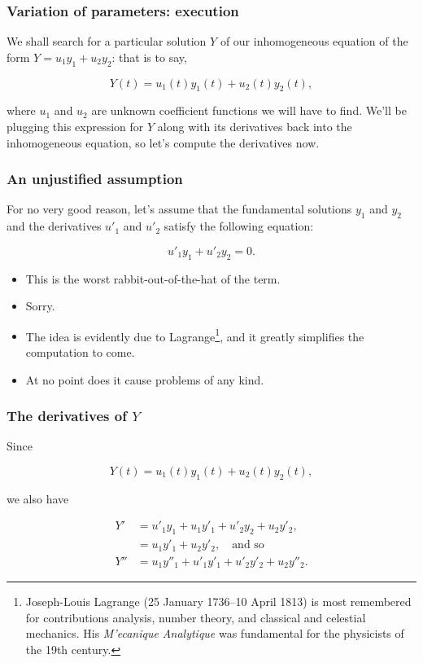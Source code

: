 \documentclass[11pt,ignorenonframetext,]{beamer}
\begin{document}
\begin{frame}\frametitle{Variation of parameters: execution}

We shall search for a particular solution $Y$ of our inhomogeneous
equation of the form $Y = u_1 y_1 + u_2 y_2$: that is to say,

\begin{equation*}
    Y(t) = u_1(t) y_1(t) + u_2(t) y_2(t),
\end{equation*}

where $u_1$ and $u_2$ are unknown coefficient functions we will have to
find. We'll be plugging this expression for $Y$ along with its
derivatives back into the inhomogeneous equation, so let's compute the
derivatives now.

\end{frame}

\begin{frame}\frametitle{An unjustified assumption}

For no very good reason, let's assume that the fundamental solutions
$y_1$ and $y_2$ and the derivatives $u'_1$ and $u'_2$ satisfy the
following equation:

\begin{equation*}
    u'_1 y_1 + u'_2 y_2  = 0.
\end{equation*}

\begin{itemize}
\itemsep1pt\parskip0pt
\item
  This is the worst rabbit-out-of-the-hat of the term.
\item
  Sorry.
\item
  The idea is evidently due to Lagrange\footnote{Joseph-Louis Lagrange
    (25 January 1736--10 April 1813) is most remembered for
    contributions analysis, number theory, and classical and celestial
    mechanics. His \emph{M'ecanique Analytique} was fundamental for the
    physicists of the 19th century.}, and it greatly simplifies the
  computation to come.
\item
  At no point does it cause problems of any kind.
\end{itemize}

\end{frame}

\begin{frame}\frametitle{The derivatives of $Y$}

Since

\begin{equation*}
    Y(t) = u_1(t) y_1(t) + u_2(t) y_2(t),
\end{equation*}

we also have

\begin{align*}
    Y'  &= u'_1 y_1 + u_1 y'_1 + u'_2 y_2 + u_2 y'_2, \\
        &= u_1 y'_1 + u_2 y'_2, \quad \text{and so} \\
    Y'' &= u_1 y''_1 + u'_1 y'_1 + u'_2 y'_2 + u_2 y''_2.
\end{align*}

\end{frame}
\end{document}

